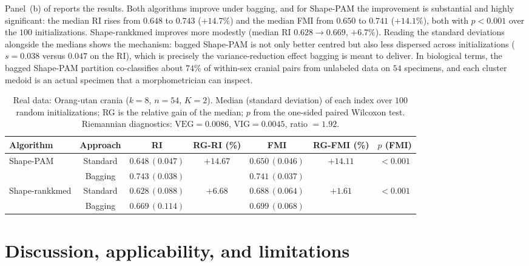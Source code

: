 \documentclass[review,11pt,3p,authoryear]{elsarticle}
\newcommand{\rmVEG}{\mathrm{VEG}}
\newcommand{\rmVIG}{\mathrm{VIG}}
\begin{document}
Panel~(b) of  reports the results. Both algorithms improve under
bagging, and for Shape-PAM the improvement is substantial and highly
significant: the median RI rises from $0.648$ to $0.743$ ($+14.7\%$) and
the median FMI from $0.650$ to $0.741$ ($+14.1\%$), both with
$p<0.001$ over the $100$ initializations. Shape-rankkmed improves more
modestly (median RI $0.628\to0.669$, $+6.7\%$). Reading the standard
deviations alongside the medians shows the mechanism: bagged Shape-PAM is
not only better centred but also less dispersed across initializations
($s=0.038$ versus $0.047$ on the RI), which is precisely the
variance-reduction effect bagging is meant to deliver. In biological
terms, the bagged Shape-PAM partition co-classifies about $74\%$ of
within-sex cranial pairs from unlabeled data on $54$ specimens, and each
cluster medoid is an actual specimen that a morphometrician can inspect.





\begin{table}[!htbp]
\centering
\caption{Real data: Orang-utan crania ($k=8$, $n=54$, $K=2$). Median (standard deviation) of each index over $100$ random initializations; RG is the relative gain of the median; $p$ from the one-sided paired Wilcoxon test. Riemannian diagnostics: $\rmVEG=0.0086$, $\rmVIG=0.0045$, ratio $=1.92$.}
\label{tab:orang}
\small
\begin{tabular}{lc cc cc c}
\toprule
Algorithm & Approach & RI & RG-RI (\%) & FMI & RG-FMI (\%) & $p$ (FMI) \\
\midrule
\multirow{2}{*}{Shape-PAM} & Standard & $0.648\,(0.047)$ & \multirow{2}{*}{$+14.67$} & $0.650\,(0.046)$ & \multirow{2}{*}{$+14.11$} & \multirow{2}{*}{$\mathbf{<\!0.001}$} \\
 & Bagging & $0.743\,(0.038)$ & & $0.741\,(0.037)$ & & \\
\multirow{2}{*}{Shape-rankkmed} & Standard & $0.628\,(0.088)$ & \multirow{2}{*}{$+6.68$} & $0.688\,(0.064)$ & \multirow{2}{*}{$+1.61$} & \multirow{2}{*}{$\mathbf{<\!0.001}$} \\
 & Bagging & $0.669\,(0.114)$ & & $0.699\,(0.068)$ & & \\
\bottomrule
\end{tabular}
\end{table}


\section{Discussion, applicability, and limitations}
\label{sec:discussion}
\end{document}
